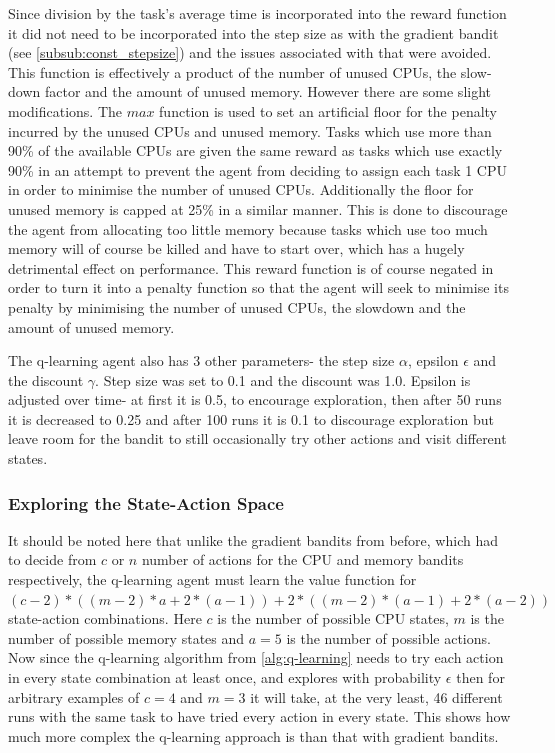 Since division by the task’s average time is incorporated into the reward function it did not need to be incorporated into the step size as with the gradient bandit (see \ref{subsub:const_stepsize}) and the issues associated with that were avoided. This function is effectively a product of the number of unused CPUs, the slow-down factor and the amount of unused memory. However there are some slight modifications. The $max$ function is used to set an artificial floor for the penalty incurred by the unused CPUs and unused memory. Tasks which use more than 90\% of the available CPUs are given the same reward as tasks which use exactly 90\% in an attempt to prevent the agent from deciding to assign each task 1 CPU in order to minimise the number of unused CPUs. Additionally the floor for unused memory is capped at 25\% in a similar manner. This is done to discourage the agent from allocating too little memory because tasks which use too much memory will of course be killed and have to start over, which has a hugely detrimental effect on performance. This reward function is of course negated in order to turn it into a penalty function so that the agent will seek to minimise its penalty by minimising the number of unused CPUs, the slowdown and the amount of unused memory.

The q-learning agent also has 3 other parameters- the step size $\alpha$, epsilon $\epsilon$ and the discount $\gamma$. Step size was set to 0.1 and the discount was 1.0. Epsilon is adjusted over time- at first it is 0.5, to encourage exploration, then after 50 runs it is decreased to 0.25 and after 100 runs it is 0.1 to discourage exploration but leave room for the bandit to still occasionally try other actions and visit different states.

\subsubsection{Exploring the State-Action Space}
\label{subsub:states}

It should be noted here that unlike the gradient bandits from before, which had to decide from $c$ or $n$ number of actions for the CPU and memory bandits respectively, the q-learning agent must learn the value function for $(c-2)*((m-2)*a + 2*(a-1)) + 2*((m-2)*(a-1) + 2*(a-2))$ state-action combinations. Here $c$ is the number of possible CPU states, $m$ is the number of possible memory states and $a=5$ is the number of possible actions. Now since the q-learning algorithm from \ref{alg:q-learning} needs to try each action in every state combination at least once, and explores with probability $\epsilon$ then for arbitrary examples of $c=4$ and $m=3$ it will take, at the very least, 46 different runs with the same task to have tried every action in every state. This shows how much more complex the q-learning approach is than that with gradient bandits.

